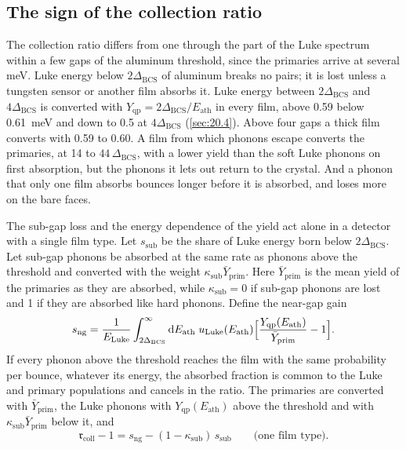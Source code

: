 \subsection{The sign of the collection ratio}\label{sec:20.5-sign}

The collection ratio differs from one through the part of the Luke spectrum within a few gaps of the aluminum threshold, since the primaries arrive at several meV. Luke energy below $2\Delta_{\mathrm{BCS}}$ of aluminum breaks no pairs; it is lost unless a tungsten sensor or another film absorbs it. Luke energy between $2\Delta_{\mathrm{BCS}}$ and $4\Delta_{\mathrm{BCS}}$ is converted with $Y_{\mathrm{qp}} = 2\Delta_{\mathrm{BCS}}/E_{\mathrm{ath}}$ in every film, above 0.59 below \SI{0.61}{meV} and down to 0.5 at $4\Delta_{\mathrm{BCS}}$ (\cref{sec:20.4}). Above four gaps a thick film converts with 0.59 to 0.60. A film from which phonons escape converts the primaries, at 14 to $44\,\Delta_{\mathrm{BCS}}$, with a lower yield than the soft Luke phonons on first absorption, but the phonons it lets out return to the crystal. And a phonon that only one film absorbs bounces longer before it is absorbed, and loses more on the bare faces.

The sub-gap loss and the energy dependence of the yield act alone in a detector with a single film type. Let $s_{\mathrm{sub}}$ be the share of Luke energy born below $2\Delta_{\mathrm{BCS}}$. Let sub-gap phonons be absorbed at the same rate as phonons above the threshold and converted with the weight $\kappa_{\mathrm{sub}}\bar Y_{\mathrm{prim}}$. Here $\bar Y_{\mathrm{prim}}$ is the mean yield of the primaries as they are absorbed, while $\kappa_{\mathrm{sub}} = 0$ if sub-gap phonons are lost and 1 if they are absorbed like hard phonons. Define the near-gap gain
\begin{equation*}
  s_{\mathrm{ng}} = \frac{1}{E_{\mathrm{Luke}}}\int_{2\Delta_{\mathrm{BCS}}}^\infty\mathrm{d} E_{\mathrm{ath}}\;u_{\mathrm{Luke}}(E_{\mathrm{ath}})\Bigl[\frac{Y_{\mathrm{qp}}(E_{\mathrm{ath}})}{\bar Y_{\mathrm{prim}}} - 1\Bigr] .
\end{equation*}
If every phonon above the threshold reaches the film with the same probability per bounce, whatever its energy, the absorbed fraction is common to the Luke and primary populations and cancels in the ratio. The primaries are converted with $\bar Y_{\mathrm{prim}}$, the Luke phonons with $Y_{\mathrm{qp}}(E_{\mathrm{ath}})$ above the threshold and with $\kappa_{\mathrm{sub}}\bar Y_{\mathrm{prim}}$ below it, and
\begin{equation}
  \mathfrak{r}_{\mathrm{coll}} - 1 = s_{\mathrm{ng}} - (1 - \kappa_{\mathrm{sub}})\,s_{\mathrm{sub}} \qquad \text{(one film type)} .
  \label{eq:20.5-sign}
\end{equation}

